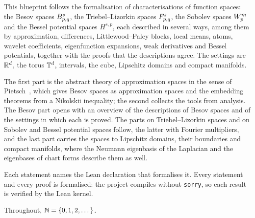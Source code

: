 
\bpintroheading

This blueprint follows the formalisation of characterisations of function spaces: the Besov
spaces $B^{s}_{p,q}$, the Triebel--Lizorkin spaces $F^{s}_{p,q}$, the Sobolev spaces
$W^{m}_{p}$ and the Bessel potential spaces $H^{s,p}$, each described in several ways, among
them by approximation, differences, Littlewood--Paley blocks, local means, atoms, wavelet
coefficients, eigenfunction expansions, weak derivatives and Bessel potentials, together with
the proofs that the descriptions agree. The
settings are $\mathbb{R}^d$, the torus $\mathbb{T}^d$, intervals, the cube, Lipschitz domains and compact
manifolds.

The first part is the abstract theory of approximation spaces in the sense of
Pietsch~\cite{Pietsch}, which gives Besov spaces as approximation spaces and the embedding
theorems from a Nikolskii inequality; the second collects the tools from analysis. The Besov
part opens with an overview of the descriptions of Besov spaces and of the settings in which
each is proved. The parts on Triebel--Lizorkin spaces and on Sobolev and Bessel potential
spaces follow, the latter with Fourier multipliers, and the last part carries the spaces to
Lipschitz domains, their boundaries and compact manifolds, where the Neumann eigenbasis of the
Laplacian and the eigenbases of chart forms describe them as well.

Each statement names the Lean declaration that formalises it. Every statement and every
proof is formalised: the project compiles without \texttt{sorry}, so each result is
verified by the Lean kernel.

Throughout, $\mathbb{N} = \{0, 1, 2, \dots\}$.








